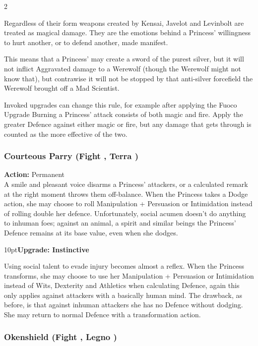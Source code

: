 \begin{multicols}{2}
\begin{mybox}
 Regardless of their form weapons created by Kensai, Javelot and Levinbolt are treated as magical damage. They are the emotions behind a Princess' willingness to hurt another, or to defend another, made manifest. 
  
 This means that a Princess' may create a sword of the purest silver, but it will not inflict Aggravated damage to a Werewolf (though the Werewolf might not know that), but contrawise it will not be stopped by that anti-silver forcefield the Werewolf brought off a Mad Scientist. 
 
 Invoked upgrades can change this rule, for example after applying the Fuoco Upgrade Burning a Princess' attack consists of both magic and fire. Apply the greater Defence against either magic or fire, but any damage that gets through is counted as the more effective of the two. 
\end{mybox}

\subsubsection*{Courteous Parry (Fight \textbullet, Terra \textbullet)}

\noindent \textbf{Action:} Permanent\\

\noindent A smile and pleasant voice disarms a Princess' attackers, or a calculated remark at the right moment throws them off-balance. When the Princess takes a Dodge action, she may choose to roll Manipulation + Persuasion or Intimidation instead of rolling double her defence. Unfortunately, social acumen doesn't do anything to inhuman foes; against an animal, a spirit and similar beings the Princess' Defence remains at its base value, even when she dodges.

\begin{myindentpar}{10pt}\textbf{Upgrade: Instinctive}

Using social talent to evade injury becomes almost a reflex. When the Princess transforms, she may choose to use her Manipulation + Persuasion or Intimidation instead of Wits, Dexterity and Athletics when calculating Defence, again this only applies against attackers with a basically human mind. The drawback, as before, is that against inhuman attackers she has no Defence without dodging. She may return to normal Defence with a transformation action.\end{myindentpar}

\subsubsection*{Okenshield (Fight \textbullet, Legno \textbullet)}


\end{multicols}
